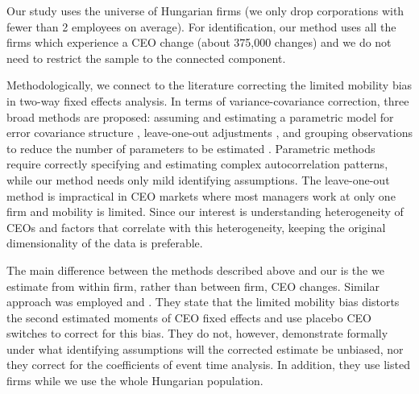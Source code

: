 \documentclass[11pt,a4paper]{article}
\begin{document}
Our study uses the universe of Hungarian firms (we only drop corporations with fewer than 2 employees on average). For identification, our method uses all the firms which experience a CEO change (about 375,000 changes) and we do not need to restrict the sample to the connected component. 

Methodologically, we connect to the literature correcting the limited mobility bias in two-way fixed effects analysis. In terms of variance-covariance correction, three broad methods are proposed: assuming and estimating a parametric model for error covariance structure \citep{andrews2008high,gaure2014correlation,kline2024firm}, leave-one-out adjustments \citep{kline2020leave}, and grouping observations to reduce the number of parameters to be estimated \citep{Bonhomme2019-xi}. Parametric methods require correctly specifying and estimating complex autocorrelation patterns, while our method needs only mild identifying assumptions. The leave-one-out method is impractical in CEO markets where most managers work at only one firm and mobility is limited. Since our interest is understanding heterogeneity of CEOs and factors that correlate with this heterogeneity, keeping the original dimensionality of the data is preferable. 

The main difference between the methods described above and our is the we estimate from within firm, rather than between firm, CEO changes. Similar approach was employed \cite{fitza2014use} and \cite{jarosiewicz2023revisiting}. They state that the limited mobility bias distorts the second estimated moments of CEO fixed effects and use placebo CEO switches to correct for this bias. They do not, however, demonstrate formally under what identifying assumptions will the corrected estimate be unbiased, nor they correct for the coefficients of event time analysis. In addition, they use listed firms while we use the whole Hungarian population. 

\end{document}
